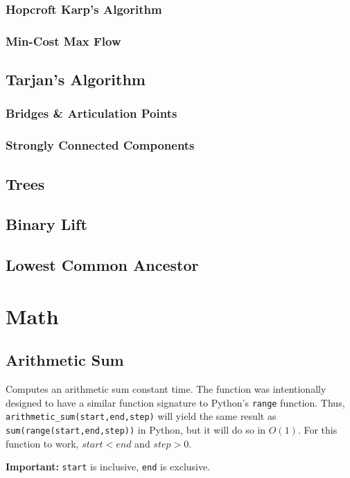 \documentclass[letterpaper,11pt,twoside]{article}
\begin{document}
                \subsubsection{Hopcroft Karp's Algorithm}
                \subsubsection{Min-Cost Max Flow}
            \subsection{Tarjan's Algorithm}
                \subsubsection{Bridges \& Articulation Points}
                \subsubsection{Strongly Connected Components}
            \subsection{Trees}
                \subsection{Binary Lift}
                \subsection{Lowest Common Ancestor}

        \section{Math}
            \subsection{Arithmetic Sum}
                Computes an arithmetic sum constant time.
                The function was intentionally designed to have a similar function signature to Python's \verb|range| function.
                Thus, \verb|arithmetic_sum(start,end,step)| will yield the same result as \verb|sum(range(start,end,step))| in Python, but it will do so in $O(1)$.
                For this function to work, $start < end$ and $step > 0$.

                \textbf{Important:} \verb|start| is inclusive, \verb|end| is exclusive.
                
                
\end{document}
